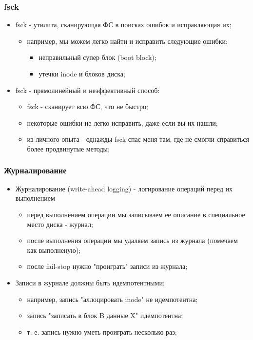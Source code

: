 \begin{frame}
\frametitle{fsck}
\begin{itemize}
  \item<1-> fsck - утилита, сканирующая ФС в поисках ошибок и исправляющая их;
    \begin{itemize}
      \item например, мы можем легко найти и исправить следующие ошибки:
         \begin{itemize}
           \item неправильный супер блок (boot block);
           \item утечки inode и блоков диска;
         \end{itemize}
    \end{itemize}
  \item<2-> fsck - прямолинейный и неэффективный способ:
    \begin{itemize}
      \item fsck - сканирует всю ФС, что не быстро;
      \item некоторые ошибки не легко исправить, даже если вы их нашли;
      \item из личного опыта - однажды fsck спас меня там, где не смогли справиться более продвинутые методы;
    \end{itemize}
\end{itemize}
\end{frame}

\begin{frame}
\frametitle{Журналирование}
\begin{itemize}
  \item<1-> Журналирование (write-ahead logging) - логирование операций перед их выполнением
    \begin{itemize}
      \item перед выполнением операции мы записываем ее описание в специальное место диска - журнал;
      \item после выполнения операции мы удаляем запись из журнала (помечаем как выполненую);
      \item после fail-stop нужно "проиграть" записи из журнала;
    \end{itemize}
  \item<2-> Записи в журнале должны быть идемпотентными:
    \begin{itemize}
      \item например, запись "аллоцировать inode" не идемпотентна;
      \item запись "записать в блок B данные X" идемпотентна;
      \item т. е. запись нужно уметь проиграть несколько раз;
    \end{itemize}
\end{itemize}
\end{frame}

